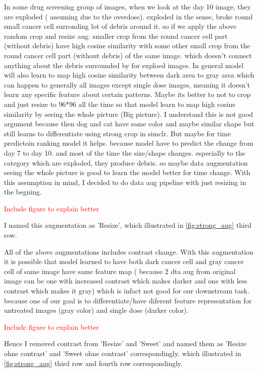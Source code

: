  In some drug screening group of images, when we look at the day 10 image, they are exploded ( assuming due to the overdose). exploded in the sense, broke round 
 small cancer cell surronding lot of debris around it. so if we apply the above random crop and resize aug: smaller crop from the round cancer cell part (without 
 debris) have high cosine similarity with some other small crop from the round cancer cell part (without debris) of the same image. which doesn't connect anything
  about the debris surrounded by for exploed images. In general model will also learn to map high cosine similarity between dark area to gray area which can happen
to generally all images except single dose images, meaning it doesn't learn any specific feature about certain patterns.
Maybe its better to not to crop and just resize to 96*96 all the time so that model learn to map high cosine similarity by seeing the whole picture (Big picture).
I understand this is not good argument because then dog and cat have same color and maybe similar shape but still learns to differentiate using strong crop in simclr.
But maybe for time predictoin ranking model it helps. because model have to predict the change from day 7 to day 10. and most of the time the size/shape changes. 
especially to the category which are exploded, they produce debris. so maybe data augmentation seeing the whole picture is good to learn the model better for time 
change.  With this assumption in mind, I decided to do data aug pipeline with just resizing in the begning.

\textcolor{red}{Include figure to explain better}

I named this augmentation as 'Resize', which illustrated in \ref{fig:strong_aug} third row.


All of the above augmentations includes contrast change. With this augmentation it is possible that model learned to have both dark cancer cell and gray cancer
cell of same image have same feature map ( because 2 dta aug from original image can be one with increased contrast which makes darker and one with less contrast 
which makes it gray) which is infact not good for our downstream task. because one of our goal is to differentiate/have diferent feature representation
for  untreated images (gray color) and single dose (darker color). 

\textcolor{red}{Include figure to explain better }

 
Hence I removed contrast from 'Resize' and 'Sweet' and named them as 'Resize ohne contrast' and 'Sweet ohne contrast' correspondingly. 
which illustrated in \ref{fig:strong_aug} third row and fourth row correspondingly. 


